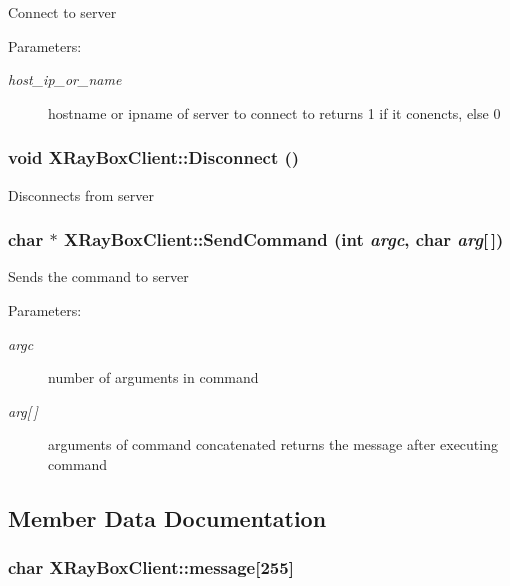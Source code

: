 Connect to server \begin{Desc}
\item[Parameters:]
\begin{description}
\item[{\em host\_\-ip\_\-or\_\-name}]hostname or ipname of server to connect to returns 1 if it conencts, else 0 \end{description}
\end{Desc}
\subsubsection{\setlength{\rightskip}{0pt plus 5cm}void XRay\-Box\-Client::Disconnect ()}\label{classXRayBoxClient_99e1a4b7eb17306c65c82c584d9a4fe7}


Disconnects from server 
\subsubsection{\setlength{\rightskip}{0pt plus 5cm}char $\ast$ XRay\-Box\-Client::Send\-Command (int {\em argc}, char {\em arg}[$\,$])}\label{classXRayBoxClient_528a4d21f4ecb407e2ae8469773f31c9}


Sends the command to server \begin{Desc}
\item[Parameters:]
\begin{description}
\item[{\em argc}]number of arguments in command \item[{\em arg\mbox{[}$\,$\mbox{]}}]arguments of command concatenated returns the message after executing command \end{description}
\end{Desc}


\subsection{Member Data Documentation}
\subsubsection{\setlength{\rightskip}{0pt plus 5cm}char \bf{XRay\-Box\-Client::message}[255]\hspace{0.3cm}{\tt  [private]}}\label{classXRayBoxClient_9771b5874cda594635642457769f9f3d}


